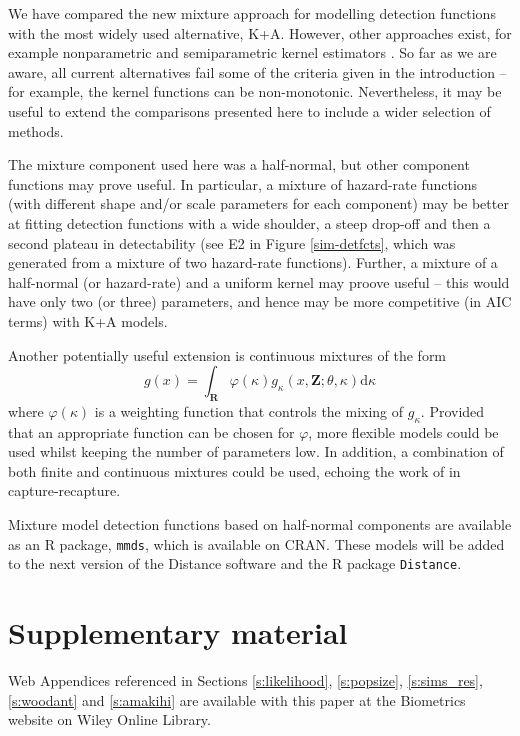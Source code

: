 \documentclass[useAMS,referee,usenatbib]{biom}
\begin{document}
We have compared the new mixture approach for modelling detection functions with the most widely used alternative, K+A.  However, other approaches exist, for example nonparametric and semiparametric kernel estimators \citep[see][and references therein]{Eidous:2011}.  So far as we are aware, all current alternatives fail some of the criteria given in the introduction -- for example, the kernel functions can be non-monotonic.  Nevertheless, it may be useful to extend the comparisons presented here to include a wider selection of methods.

The mixture component used here was a half-normal, but other component functions may prove useful.  In particular, a mixture of hazard-rate functions (with different shape and/or scale parameters for each component) may be better at fitting detection functions with a wide shoulder, a steep drop-off and then a second plateau in detectability (see E2 in Figure \ref{sim-detfcts}, which was generated from a mixture of two hazard-rate functions).  Further, a mixture of a half-normal (or hazard-rate) and a uniform kernel may proove useful -- this would have only two (or three) parameters, and hence may be more competitive (in AIC terms) with K+A models.

Another potentially useful extension is continuous mixtures of the form
\begin{equation*}
g(x) = \int_\mathbf{R} \varphi(\kappa) g_\kappa(x,\mathbf{Z}; \theta, \kappa) \text{d}\kappa
\end{equation*}
where $\varphi(\kappa)$ is a weighting function that controls the mixing of $g_\kappa$. Provided that an appropriate function can be chosen for $\varphi$, more flexible models could be used whilst keeping the number of parameters low. In addition, a combination of both finite and continuous mixtures could be used, echoing the work of \cite{Morgan:2008wy} in capture-recapture.

Mixture model detection functions based on half-normal components are available as an \textsf{R} package, \texttt{mmds}, which is available on CRAN. These models will be added to the next version of the Distance software and the \textsf{R} package \texttt{Distance}.

\section*{Supplementary material}

Web Appendices referenced in Sections \ref{s:likelihood}, \ref{s:popsize}, \ref{s:sims_res}, \ref{s:woodant} and \ref{s:amakihi} are available with this paper at the Biometrics website on Wiley Online Library.
\end{document}
